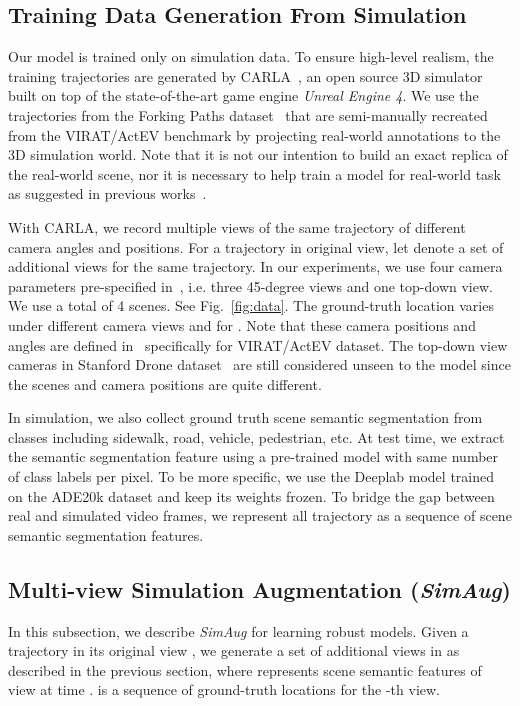\documentclass[runningheads]{eccv2020/llncs}
\newcommand{\fancyname}{SimAug}
\begin{document}
\subsection{Training Data Generation From Simulation}
\label{sec:data}
Our model is trained only on simulation data. To ensure high-level realism, the training trajectories are generated by CARLA~\cite{dosovitskiy2017carla}, an open source 3D simulator built on top of the state-of-the-art game engine \textit{Unreal Engine 4}. We use the trajectories from the Forking Paths dataset~\cite{liang2020garden} that are semi-manually recreated from the VIRAT/ActEV benchmark by projecting real-world annotations to the 3D simulation world. Note that it is not our intention to build an exact replica of the real-world scene, nor it is necessary to help train a model for real-world task as suggested in previous works~\cite{gaidon2016virtual,ros2016synthia,liang2020garden,zhang2019rsa}.

With CARLA, we record multiple views of the same trajectory of different camera angles and positions. For a trajectory  in original view, let  denote a set of additional views for the same trajectory.
In our experiments, we use four camera parameters pre-specified in~\cite{liang2020garden}, i.e. three 45-degree views and one top-down view. 
We use a total of 4 scenes. See Fig.~\ref{fig:data}. 
The ground-truth location varies under different camera views and  for .
Note that these camera positions and angles are defined in~\cite{liang2020garden} specifically for VIRAT/ActEV dataset.
The top-down view cameras in Stanford Drone dataset~\cite{robicquet2016learning} are still considered unseen to the model since the scenes and camera positions are quite different.


In simulation, we also collect ground truth scene semantic segmentation from  classes including sidewalk, road, vehicle, pedestrian, etc. At test time, we extract the semantic segmentation feature using a pre-trained model with same number of class labels per pixel. To be more specific, we use the Deeplab model \cite{chen2017deeplab} trained on the ADE20k \cite{zhou2017scene} dataset and keep its weights frozen. To bridge the gap between real and simulated video frames, we represent all trajectory  as a sequence of scene semantic segmentation features.



\subsection{Multi-view Simulation Augmentation (\textit{\fancyname})}
\label{sec:simaug}
In this subsection, we describe \textit{\fancyname} for learning robust models. Given a trajectory in its original view , we generate a set of additional views in  as described in the previous section, where  represents scene semantic features of view  at time .  is a sequence of ground-truth locations for the -th view.
\end{document}
